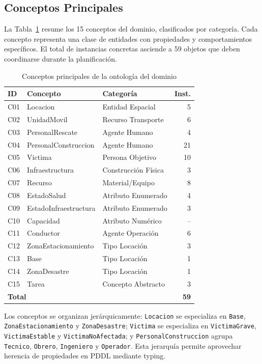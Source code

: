 \documentclass[conference]{IEEEtran}
\begin{document}
    \subsection{Conceptos Principales}

    La Tabla~\ref{tab:conceptos} resume los 15 conceptos del dominio, clasificados por categoría. Cada concepto representa una clase de entidades con propiedades y comportamientos específicos. El total de instancias concretas asciende a 59 objetos que deben coordinarse durante la planificación.

    \begin{table}[htbp]
    \caption{Conceptos principales de la ontología del dominio}
    \label{tab:conceptos}
    \centering
    \small
    \begin{tabular}{@{}lllr@{}}
    \toprule
    \textbf{ID} & \textbf{Concepto} & \textbf{Categoría} & \textbf{Inst.} \\
    \midrule
    C01 & Locacion & Entidad Espacial & 5 \\
    C02 & UnidadMovil & Recurso Transporte & 6 \\
    C03 & PersonalRescate & Agente Humano & 4 \\
    C04 & PersonalConstruccion & Agente Humano & 21 \\
    C05 & Victima & Persona Objetivo & 10 \\
    C06 & Infraestructura & Construcción Física & 3 \\
    C07 & Recurso & Material/Equipo & 8 \\
    C08 & EstadoSalud & Atributo Enumerado & 4 \\
    C09 & EstadoInfraestructura & Atributo Enumerado & 3 \\
    C10 & Capacidad & Atributo Numérico & -- \\
    C11 & Conductor & Agente Operación & 6 \\
    C12 & ZonaEstacionamiento & Tipo Locación & 3 \\
    C13 & Base & Tipo Locación & 1 \\
    C14 & ZonaDesastre & Tipo Locación & 1 \\
    C15 & Tarea & Concepto Abstracto & 3 \\
    \midrule
    \multicolumn{3}{l}{\textbf{Total}} & \textbf{59} \\
    \bottomrule
    \end{tabular}
    \end{table}

    Los conceptos se organizan jerárquicamente: \texttt{Locacion} se especializa en \texttt{Base}, \texttt{ZonaEstacionamiento} y \texttt{ZonaDesastre}; \texttt{Victima} se especializa en \texttt{VictimaGrave}, \texttt{VictimaEstable} y \texttt{VictimaNoAfectada}; y \texttt{PersonalConstruccion} agrupa \texttt{Tecnico}, \texttt{Obrero}, \texttt{Ingeniero} y \texttt{Operador}. Esta jerarquía permite aprovechar herencia de propiedades en PDDL mediante typing.
\end{document}
